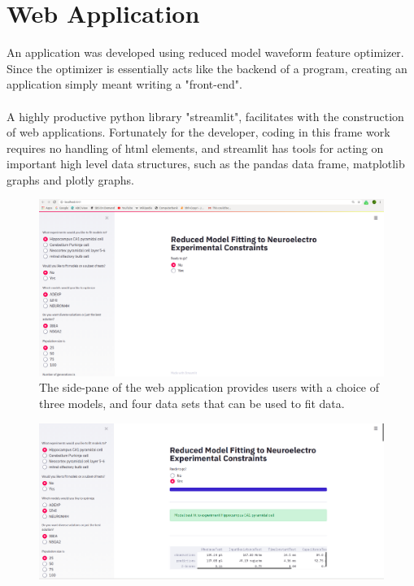 \section{Web Application}
An application was developed using reduced model waveform feature optimizer. Since the optimizer is essentially acts like the backend of a program, creating an application simply meant writing a "front-end".\\
\\
A highly productive python library "streamlit", facilitates with the construction of web applications. Fortunately for the developer, coding in this frame work requires no handling of html elements, and streamlit has tools for acting on important high level data structures, such as the pandas data frame, matplotlib graphs and plotly graphs.\\
\begin{figure}[h!]
\includegraphics[]{chapters/app_tex/web_app_thesis}
\caption{The side-pane of the web application provides users with a choice of three models, and four data sets that can be used to fit data.
}
\end{figure}
\begin{figure}
\includegraphics[]{chapters/app_tex/app_results}
\end{figure}

